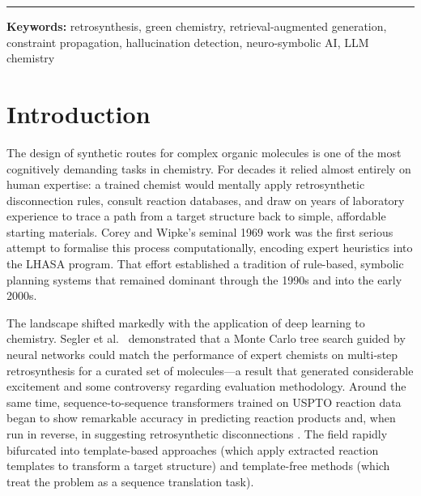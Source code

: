 \documentclass[12pt,a4paper]{article}
\begin{document}
\begin{titlepage}
\begin{abstract}
    while the reasoning timeline component makes each decision step auditable.
    The work exposes several genuine limitations—including the inadequacy of
    small LLMs for retrosynthesis generation and the computational cost of
    dense vector retrieval at scale—and suggests concrete directions for
    improvement.
  \end{abstract}
  \vspace{0.5cm}
  \hrule
  \vspace{0.5cm}
  {\small \textbf{Keywords:} retrosynthesis, green chemistry, retrieval-augmented generation,
  constraint propagation, hallucination detection, neuro-symbolic AI, LLM chemistry}
\end{titlepage}

\tableofcontents
\newpage

\section{Introduction}

The design of synthetic routes for complex organic molecules is one of the most
cognitively demanding tasks in chemistry. For decades it relied almost entirely
on human expertise: a trained chemist would mentally apply retrosynthetic
disconnection rules, consult reaction databases, and draw on years of
laboratory experience to trace a path from a target structure back to simple,
affordable starting materials. Corey and Wipke's seminal 1969 work
\cite{corey1969lhasa} was the first serious attempt to formalise this process
computationally, encoding expert heuristics into the LHASA program. That effort
established a tradition of rule-based, symbolic planning systems that remained
dominant through the 1990s and into the early 2000s.

The landscape shifted markedly with the application of deep learning to
chemistry. Segler et al.~\cite{segler2018mcts} demonstrated that a Monte Carlo
tree search guided by neural networks could match the performance of expert
chemists on multi-step retrosynthesis for a curated set of molecules—a result
that generated considerable excitement and some controversy regarding evaluation
methodology. Around the same time, sequence-to-sequence transformers trained on
USPTO reaction data began to show remarkable accuracy in predicting reaction
products and, when run in reverse, in suggesting retrosynthetic disconnections
\cite{schwaller2019molecular,liu2017retrosynthesis}. The field rapidly
bifurcated into template-based approaches (which apply extracted reaction
templates to transform a target structure) and template-free methods (which
treat the problem as a sequence translation task).
\end{document}
